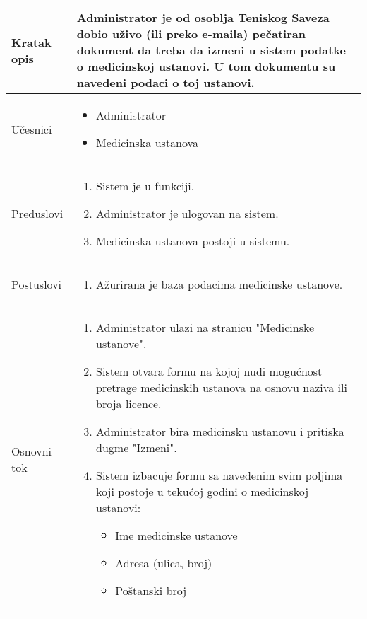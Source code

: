 \documentclass{article}
\begin{document}
    \begin{longtable}{| p{} | p{} |} 
        \hline
            Kratak opis & Administrator je od osoblja Teniskog Saveza dobio uživo (ili preko e-maila) pečatiran dokument da treba da izmeni u sistem podatke o medicinskoj ustanovi. U tom dokumentu su navedeni podaci o toj ustanovi. \\ 
        \hline    
            Učesnici &\begin{itemize}
               \item Administrator
               \item Medicinska ustanova
            \end{itemize} \\
        \hline
           Preduslovi & \begin{enumerate}
               \item Sistem je u funkciji.
               \item Administrator je ulogovan na sistem.
               \item Medicinska ustanova postoji u sistemu.
           \end{enumerate}\\
        \hline  
            Postuslovi & \begin{enumerate}
                \item Ažurirana je baza podacima medicinske ustanove.
            \end{enumerate}\\
        \hline
            Osnovni tok & \begin{enumerate}
                \item Administrator ulazi na stranicu "Medicinske ustanove".
                \item Sistem otvara formu na kojoj nudi mogućnost pretrage medicinskih ustanova na osnovu naziva ili broja licence.
                \item Administrator bira medicinsku ustanovu i pritiska dugme "Izmeni".
                \item Sistem izbacuje formu sa navedenim svim poljima koji postoje u tekućoj godini o medicinskoj ustanovi:
                        \begin{itemize}
                            \item Ime medicinske ustanove
                            \item Adresa (ulica, broj)
                            \item Poštanski broj

\end{itemize}
\end{enumerate}
\end{longtable}
\end{document}
